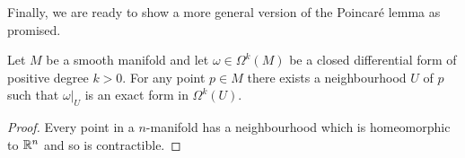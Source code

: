 Finally, we are ready to show a more general version of the Poincar\'e lemma as promised.

\begin{corollary}\label{cor:plemma}
	Let $M$ be a smooth manifold and let $\omega\in\Omega^k(M)$ be a closed differential form of positive degree $k>0$.
	For any point $p\in M$ there exists a neighbourhood $U$ of $p$ such that $\omega|_U$ is an exact form in $\Omega^k(U)$.
\end{corollary}
\begin{proof}
	Every point in a $n$-manifold has a neighbourhood which is homeomorphic to $\mathbb{R}^n$ and so is contractible.
\end{proof}
